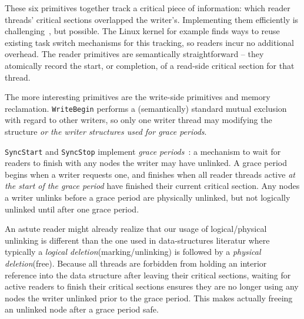 These six primitives together track a critical piece of information: which reader threads' critical sections overlapped the writer's.
Implementing them efficiently is challenging~\cite{urcu_ieee}, but possible.
The Linux kernel for example finds ways to reuse existing task switch mechanisms for this tracking, so readers incur no additional overhead.
The reader primitives are semantically straightforward -- they atomically record the start, or completion, of a read-side critical section for that thread.

The more interesting primitives are the write-side primitives and memory reclamation.
\lstinline|WriteBegin| performs a (semantically) standard mutual exclusion with regard to other writers, so only one writer thread may modifying the structure \emph{or the writer structures used for grace periods}. %

\lstinline|SyncStart| and \lstinline|SyncStop| implement \emph{grace periods}~\cite{grc}: a mechanism to wait for readers to finish with any nodes the writer may have unlinked.  A grace period begins when a writer requests one, and finishes when all reader threads active \emph{at the start of the grace period} have finished their current critical section.
Any nodes a writer unlinks before a grace period are physically unlinked, but not logically unlinked until after one grace period.

An astute reader might already realize that our usage of logical/physical unlinking is different than the one used in data-structures literatur where typically a \textit{logical deletion}(marking/unlinking) is followed by a \textit{physical deletion}(free).
Because all threads are forbidden from holding an interior reference into the data structure after leaving their critical sections, waiting for active readers to finish their critical sections ensures they are no longer using any nodes the writer unlinked prior to the grace period.
This makes actually freeing an unlinked node after a grace period safe.

